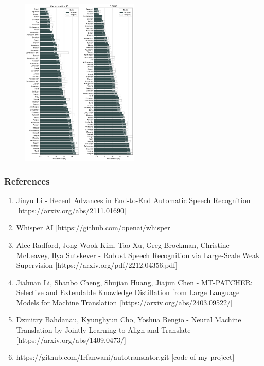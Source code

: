 \documentclass[12px]{beamer}
\begin{document}
\begin{frame}
    \begin{figure}
        \includegraphics[width=0.5\textwidth]{wer-cer.png}
    \end{figure}
    \end{frame}


\begin{frame}
    \frametitle{References}
    \begin{enumerate}
        \item Jinyu Li - Recent Advances in End-to-End Automatic Speech Recognition [https://arxiv.org/abs/2111.01690]
        \item Whisper AI [https://github.com/openai/whisper]
        \item Alec Radford, Jong Wook Kim, Tao Xu,  Greg Brockman,  Christine McLeavey, Ilya Sutskever - Robust Speech Recognition via Large-Scale Weak Supervision [https://arxiv.org/pdf/2212.04356.pdf]
        \item Jiahuan Li, Shanbo Cheng, Shujian Huang, Jiajun Chen - MT-PATCHER: Selective and Extendable Knowledge Distillation from Large Language Models for Machine Translation [https://arxiv.org/abs/2403.09522/]
        \item Dzmitry Bahdanau, Kyunghyun Cho, Yoshua Bengio - Neural Machine Translation by Jointly Learning to Align and Translate
        [https://arxiv.org/abs/1409.0473/]
        \item https://github.com/Irfanwani/autotranslator.git [code of my project]
        
    \end{enumerate}
\end{frame}
\end{document}
